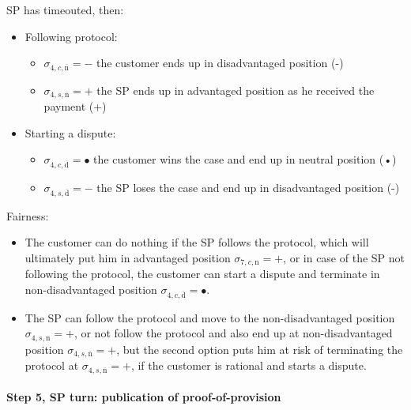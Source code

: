 \documentclass{ieeeaccess}
\begin{document}
SP has timeouted, then:

\begin{itemize}
\item
  Following protocol:

  \begin{itemize}
  
  \item
    \(\sigma_{4, c, \overline{\mathrm{n}}} = -\) the customer ends up in
    disadvantaged position (-)
  \item
    \(\sigma_{4, s, \overline{\mathrm{n}}} = +\) the SP ends up in
    advantaged position as he received the payment (+)
  \end{itemize}
\item
  Starting a dispute:

  \begin{itemize}
  
  \item
    \(\sigma_{4, c, \overline{\mathrm{d}}} = •\) the customer wins the
    case and end up in neutral position (•)
  \item
    \(\sigma_{4, s, \overline{\mathrm{d}}} = -\) the SP loses the case
    and end up in disadvantaged position (-)
  \end{itemize}
\end{itemize}

Fairness:

\begin{itemize}

\item
  The customer can do nothing if the SP follows the protocol, which will
  ultimately put him in advantaged position
  \(\sigma_{7, c, \mathrm{n}} = +\), or in case of the SP not following
  the protocol, the customer can start a dispute and terminate in
  non-disadvantaged position
  \(\sigma_{4, c, \overline{\mathrm{d}}} = •\).
\item
  The SP can follow the protocol and move to the non-disadvantaged
  position \(\sigma_{4, s, \mathrm{n}} = +\), or not follow the protocol
  and also end up at non-disadvantaged position
  \(\sigma_{4, s, \overline{\mathrm{n}}} = +\), but the second option
  puts him at risk of terminating the protocol at
  \(\sigma_{4, s, \overline{\mathrm{n}}} = +\), if the customer is
  rational and starts a dispute.
\end{itemize}

\paragraph{Step 5, SP turn: publication of
proof-of-provision}\label{step-5-publication-of-proof-of-provision}
\end{document}
